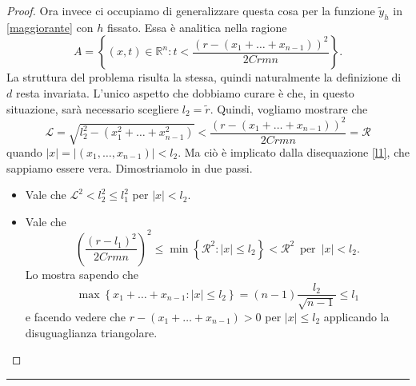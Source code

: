 \begin{proof}
Ora invece ci occupiamo di generalizzare questa cosa per la funzione $\widetilde{y}_h$ in \ref{maggiorante} con $h$ fissato. Essa è analitica nella ragione 
$$A = \left\{ (x,t) \in \mathbb{R}^n : t<\frac{(r-(x_1+\ldots +x_{n-1}))^2}{2Crmn} \right\} .$$
La struttura del problema risulta la stessa, quindi naturalmente la definizione di $d$ resta invariata. L'unico aspetto che dobbiamo curare è che, in questo situazione, sarà necessario scegliere $l_2 =\widetilde{r}$. 
Quindi, vogliamo mostrare che $$\mathcal{L}=\sqrt{l_2^2-(x_1^2+\ldots +x_{n-1}^2)} < \frac{(r-(x_1+\ldots +x_{n-1}))^2}{2Crmn}=\mathcal{R}$$
quando $|x|=|(x_1,\ldots ,x_{n-1})|< l_2$. Ma ciò è implicato dalla disequazione \ref{l1}, che sappiamo essere vera. Dimostriamolo in due passi.
\begin{itemize}
\item Vale che $\mathcal{L}^2< l_2^2 \leq l_1^2$ per $|x|< l_2$.
\item Vale che $$\left(\frac{(r-l_1)^2}{2Crmn}\right)^2 \leq \min \left\{ \mathcal{R}^2 : |x|\leq l_2 \right\}< \mathcal{R}^2 \, \text{ per } \, |x|< l_2.$$
Lo mostra sapendo che $$\max \left\{ x_1+\ldots +x_{n-1} : |x|\leq l_2\right\}= (n-1)\frac{l_2}{\sqrt{n-1}}\leq l_1$$ e facendo vedere che $r-(x_1+\ldots +x_{n-1})>0$ per $|x|\leq l_2$ applicando la disuguaglianza triangolare.
\qedhere
\end{itemize}
\end{proof}

\noindent\rule[0.5ex]{\linewidth}{0.2pt}

